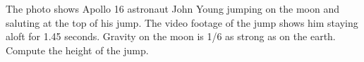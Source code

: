 The photo shows Apollo 16 astronaut John Young jumping on the moon and saluting at the top of his
jump. The video footage of the jump shows him staying aloft for 1.45 seconds. Gravity on the moon
is 1/6 as strong as on the earth. Compute the height of the jump.\answercheck
